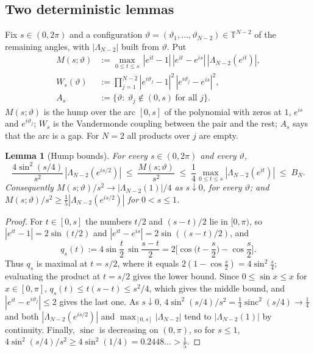 \documentclass[12pt]{amsart}
\newtheorem{lemma}{Lemma}
\theoremstyle{remark}
\newcommand{\T}{\mathbb{T}}
\newcommand{\1}{\mathbf{1}}
\newcommand{\sinc}{\operatorname{sinc}}
\begin{document}
\subsection{Two deterministic lemmas}
Fix $s\in(0,2\pi)$ and a configuration
$\vartheta=(\vartheta_1,\dots,\vartheta_{N-2})\in\T^{N-2}$ of the
remaining angles, with $|\Lambda_{N-2}|$ built from $\vartheta$. Put
\begin{align*}
M(s;\vartheta)&:=\max_{0\le t\le s}\,|e^{it}-1|\,|e^{it}-e^{is}|\,
|\Lambda_{N-2}(e^{it})|,\\
W_s(\vartheta)&:=\prod_{j=1}^{N-2}|e^{i\vartheta_j}-1|^2\,
|e^{i\vartheta_j}-e^{is}|^2,\\
A_s&:=\{\vartheta:\ \vartheta_j\notin(0,s)\ \text{for all } j\}.
\end{align*}
$M(s;\vartheta)$ is the hump over the arc $[0,s]$ of the polynomial with
zeros at $1$, $e^{is}$ and $e^{i\vartheta_j}$; $W_s$ is the Vandermonde
coupling between the pair and the rest; $A_s$ says that the arc is a gap.
For $N=2$ all products over $j$ are empty.

\begin{lemma}[Hump bounds]\label{lem:hump}
For every $s\in(0,2\pi)$ and every $\vartheta$,
\begin{equation}\label{eq:hump}
\frac{4\sin^2(s/4)}{s^2}\,|\Lambda_{N-2}(e^{is/2})|
\;\le\;\frac{M(s;\vartheta)}{s^2}\;\le\;
\frac14\max_{0\le t\le s}|\Lambda_{N-2}(e^{it})|\;\le\;B_N .
\end{equation}
Consequently $M(s;\vartheta)/s^2\to|\Lambda_{N-2}(1)|/4$ as $s\downarrow0$,
for every $\vartheta$; and $M(s;\vartheta)/s^2\ge\frac15|\Lambda_{N-2}(e^{is/2})|$
for $0<s\le1$.
\end{lemma}

\begin{proof}
For $t\in[0,s]$ the numbers $t/2$ and $(s-t)/2$ lie in $[0,\pi)$, so
$|e^{it}-1|=2\sin(t/2)$ and $|e^{it}-e^{is}|=2\sin((s-t)/2)$, and
\[
q_s(t):=4\sin\frac t2\,\sin\frac{s-t}2
=2\Big[\cos\Big(t-\frac s2\Big)-\cos\frac s2\Big].
\]
Thus $q_s$ is maximal at $t=s/2$, where it equals
$2(1-\cos\frac s2)=4\sin^2\frac s4$; evaluating the product at $t=s/2$ gives
the lower bound. Since $0\le\sin x\le x$ for $x\in[0,\pi]$,
$q_s(t)\le t(s-t)\le s^2/4$, which gives the middle bound, and
$|e^{it}-e^{i\vartheta_j}|\le2$ gives the last one. As $s\downarrow0$,
$4\sin^2(s/4)/s^2=\frac14\sinc^2(s/4)\to\frac14$ and both
$|\Lambda_{N-2}(e^{is/2})|$ and $\max_{[0,s]}|\Lambda_{N-2}|$ tend to
$|\Lambda_{N-2}(1)|$ by continuity. Finally, $\sinc$ is decreasing on
$(0,\pi)$, so for $s\le1$, $4\sin^2(s/4)/s^2\ge4\sin^2(1/4)=0.2448\ldots>\frac15$.
\end{proof}
\end{document}

